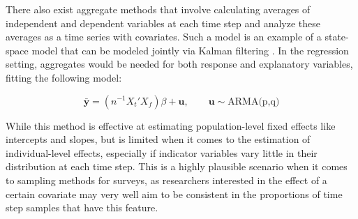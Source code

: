 

There also exist aggregate methods that involve calculating 
averages of independent and dependent variables at each time 
step and analyze these averages as a time series with covariates.
 Such a model is an example of a state-space model that can be 
 modeled jointly via Kalman filtering \cite{BrockwellDavis1991}. 
 In the regression setting, aggregates would be needed for both 
 response and explanatory variables, fitting the following model:

$$ \bar{\mathbf{y}} = (n^{-1}X_t'X_f)\beta + \mathbf{u}, \qquad \mathbf{u}\sim\text{ARMA(p,q)} $$

  While this method is effective at estimating population-level 
  fixed effects like intercepts and slopes, but is limited when 
  it comes to the estimation of individual-level effects, 
  especially if indicator variables vary little in their 
  distribution at each time step. This is a highly plausible
   scenario when it comes to sampling methods for surveys, as 
   researchers interested in the effect of a certain covariate 
   may very well aim to be consistent in the proportions of time 
   step samples that have this feature.


  
  






